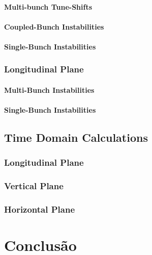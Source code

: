 \subsubsection{Multi-bunch Tune-Shifts}
\subsubsection{Coupled-Bunch Instabilities}
\subsubsection{Single-Bunch Instabilities}
\subsection{Longitudinal Plane}
\subsubsection{Multi-Bunch Instabilities}
\subsubsection{Single-Bunch Instabilities}
\section{Time Domain Calculations}
\subsection{Longitudinal Plane}
\subsection{Vertical Plane}
\subsection{Horizontal Plane}


%

\chapter*[Conclusão]{Conclusão}
\lipsum[1-5]


\postextual

% 
% 
% 



